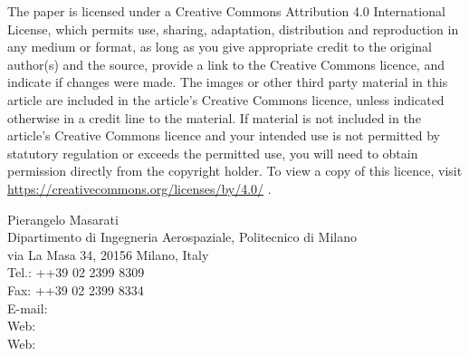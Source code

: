 \documentclass[10pt,fleqn,subeqn]{report}
\begin{document}
The paper is licensed under a Creative Commons Attribution 4.0
International License, which permits use, sharing, adaptation, distribution and
reproduction in any medium or format, as long as you give appropriate credit to
the original author(s) and the source, provide a link to the Creative Commons
licence, and indicate if changes were made. The images or other third party
material in this article are included in the article's Creative Commons licence,
unless indicated otherwise in a credit line to the material. If material is not
included in the article's Creative Commons licence and your intended use is not
permitted by statutory regulation or exceeds the permitted use, you will need
to obtain permission directly from the copyright holder. To view a copy of this
licence, visit \href{https://creativecommons.org/licenses/by/4.0/}{https://creativecommons.org/licenses/by/4.0/} .


\pagebreak
\noindent
Pierangelo Masarati \\
Dipartimento di Ingegneria Aerospaziale, Politecnico di Milano \\
via La Masa 34, 20156 Milano, Italy \\
Tel.: ++39 02 2399 8309 \\
Fax: ++39 02 2399 8334 \\
E-mail:  \\
Web:  \\
Web:  \\
\end{document}
